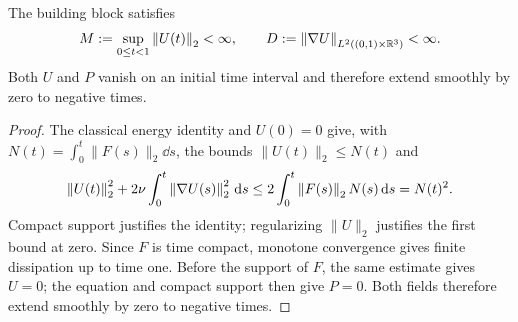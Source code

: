 \begin{lemma}\label{lem:packetenergy}
The building block satisfies
\[
 M:=\sup_{0\le t<1}\left\lVert U(t)\right\rVert_2<\infty,\qquad
 D:=\left\lVert\nabla U\right\rVert_{L^2((0,1)\times\mathbb R^3)}<\infty.
\]
Both $U$ and $P$ vanish on an initial time interval and therefore extend smoothly by zero to negative times.
\end{lemma}
\begin{proof}
The classical energy identity and $U(0)=0$ give, with
$N(t)=\int_0^t\|F(s)\|_2\dd s$, the bounds $\|U(t)\|_2\le N(t)$ and
\begin{equation}\label{eq:packetenergy}
 \left\lVert U(t)\right\rVert_2^2+2\nu\int_0^t\left\lVert\nabla U(s)\right\rVert_2^2\,\mathrm d s
 \le 2\int_0^t\left\lVert F(s)\right\rVert_2N(s)\,\mathrm d s=N(t)^2.
\end{equation}
Compact support justifies the identity; regularizing $\|U\|_2$ justifies
the first bound at zero. Since $F$ is time compact, monotone convergence
gives finite dissipation up to time one. Before the support of $F$, the
same estimate gives $U=0$; the equation and compact support then give $P=0$.
Both fields therefore extend smoothly by zero to negative times.
\end{proof}
